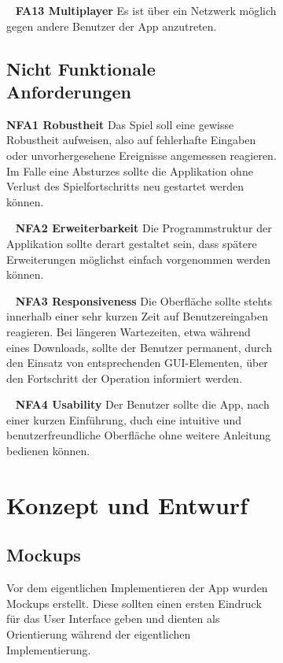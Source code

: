 \documentclass{scrartcl}
\begin{document}
\begin{figure}[!ht]
\begin{figure}[!ht]
\ \newline
\textbf{FA13 Multiplayer} \newline
Es ist über ein Netzwerk möglich gegen andere Benutzer der App anzutreten.


\subsection{Nicht Funktionale Anforderungen}

\textbf{NFA1 Robustheit} \newline
Das Spiel soll eine gewisse Robustheit aufweisen, also auf fehlerhafte Eingaben
oder unvorhergesehene Ereignisse angemessen reagieren. Im Falle eine Absturzes
sollte die Applikation ohne Verlust des Spielfortschritts neu gestartet werden
können.

\ \newline
\textbf{NFA2 Erweiterbarkeit} \newline
Die Programmstruktur der Applikation sollte derart gestaltet sein, dass
spätere Erweiterungen möglichst einfach vorgenommen werden können.

\ \newline
\textbf{NFA3 Responsiveness} \newline
Die Oberfläche sollte stehts innerhalb einer sehr kurzen Zeit auf
Benutzereingaben reagieren. Bei längeren Wartezeiten, etwa während eines
Downloads, sollte der Benutzer permanent, durch den Einsatz von entsprechenden
GUI-Elementen, über den Fortschritt der Operation informiert werden.

\ \newline
\textbf{NFA4 Usability} \newline
Der Benutzer sollte die App, nach einer kurzen Einführung, duch eine intuitive
und benutzerfreundliche Oberfläche ohne weitere Anleitung bedienen können.

\section{Konzept und Entwurf}
\subsection{Mockups}
Vor dem eigentlichen Implementieren der App wurden Mockups erstellt. Diese sollten einen ersten Eindruck für das User Interface geben und dienten als Orientierung während der eigentlichen Implementierung.


\end{figure}
\end{figure}
\end{document}
